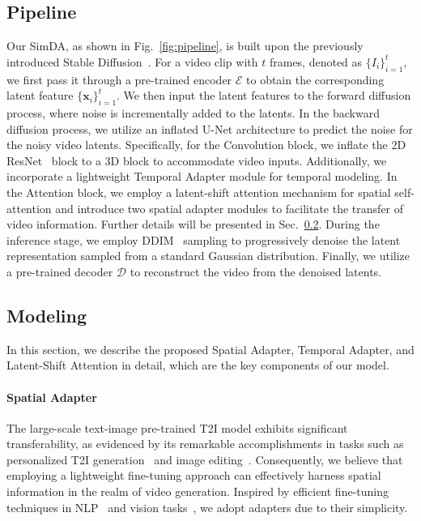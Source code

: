 \subsection{Pipeline}
\label{Pipeline}
Our SimDA, as shown in Fig.~\ref{fig:pipeline}, is built upon the previously introduced Stable Diffusion~\cite{stablediffusion}.
For a video clip with $t$ frames, denoted as $\{I_i\}_{i=1}^t$, we first pass it through a pre-trained encoder $\mathcal{E}$ to obtain the corresponding latent feature $\{\bm{x}_i\}_{i=1}^t$. We then input the latent features to the forward diffusion process, where noise is incrementally added to the latents. In the backward diffusion process, we utilize an inflated U-Net architecture to predict the noise for the noisy video latents. 
Specifically, for the Convolution block, we inflate the 2D ResNet~\cite{resnet} block to a 3D block to accommodate video inputs. Additionally, we incorporate a lightweight Temporal Adapter module for temporal modeling. In the Attention block, we employ a latent-shift attention mechanism for spatial self-attention and introduce two spatial adapter modules to facilitate the transfer of video information. Further details will be presented in Sec.~\ref{model}. During the inference stage, we employ DDIM~\cite{ddim} sampling to progressively denoise the latent representation sampled from a standard Gaussian distribution. Finally, we utilize a pre-trained decoder $\mathcal{D}$ to reconstruct the video from the denoised latents.

\subsection{Modeling}
\label{model}

In this section, we describe the proposed Spatial Adapter, Temporal Adapter, and Latent-Shift Attention in detail, which are the key components of our model.
\paragraph{Spatial Adapter}
The large-scale text-image pre-trained T2I model exhibits significant transferability, as evidenced by its remarkable accomplishments in tasks such as personalized T2I generation~\cite{ruiz2023dreambooth,mou2023t2iadapter} and image editing~\cite{hertz2022prompt2prompt, controlnet}. Consequently, we believe that employing a lightweight fine-tuning approach can effectively harness spatial information in the realm of video generation.
Inspired by efficient fine-tuning techniques in NLP~\cite{hu2021lora, li2021prefix } and vision tasks~\cite{chen2022adaptformer, yang2023aim}, we adopt adapters due to their simplicity. 

